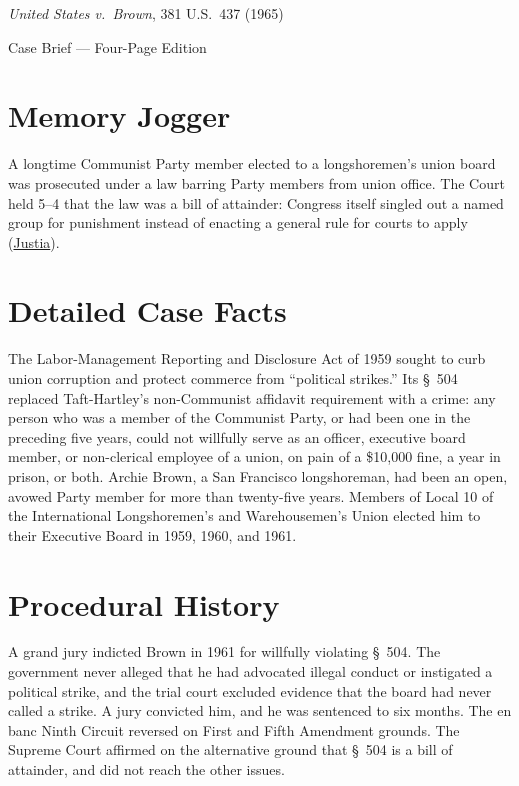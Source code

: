 \documentclass[12pt]{article}
\begin{document}
\begin{center}
{\LARGE \textit{United States v.\ Brown}, 381 U.S.\ 437 (1965)\par}
\vspace{0.8em}
{\large Case Brief --- Four-Page Edition\par}
\end{center}
\vspace{1em}

\section{Memory Jogger}

A longtime Communist Party member elected to a longshoremen's union board was prosecuted under a law barring Party members from union office. The Court held 5--4 that the law was a bill of attainder: Congress itself singled out a named group for punishment instead of enacting a general rule for courts to apply (\href{https://supreme.justia.com/cases/federal/us/381/437/}{Justia}).

\section{Detailed Case Facts}

The Labor-Management Reporting and Disclosure Act of 1959 sought to curb union corruption and protect commerce from ``political strikes.'' Its \S~504 replaced Taft-Hartley's non-Communist affidavit requirement with a crime: any person who was a member of the Communist Party, or had been one in the preceding five years, could not willfully serve as an officer, executive board member, or non-clerical employee of a union, on pain of a \$10,000 fine, a year in prison, or both. Archie Brown, a San Francisco longshoreman, had been an open, avowed Party member for more than twenty-five years. Members of Local 10 of the International Longshoremen's and Warehousemen's Union elected him to their Executive Board in 1959, 1960, and 1961.

\section{Procedural History}

A grand jury indicted Brown in 1961 for willfully violating \S~504. The government never alleged that he had advocated illegal conduct or instigated a political strike, and the trial court excluded evidence that the board had never called a strike. A jury convicted him, and he was sentenced to six months. The en banc Ninth Circuit reversed on First and Fifth Amendment grounds. The Supreme Court affirmed on the alternative ground that \S~504 is a bill of attainder, and did not reach the other issues.
\end{document}
